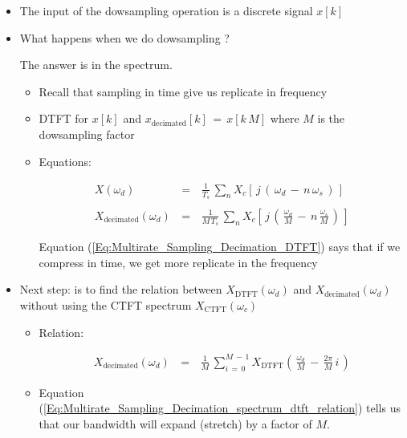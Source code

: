 \begin{itemize}

\item The input of the dowsampling operation is a discrete signal $x[k]$

\item What happens when we do dowsampling ?

The answer is in the spectrum.

\begin{itemize}
\item Recall that sampling in time give us replicate in frequency

\item DTFT for $x[k]$ and $x_{\text{decimated}}[k] \, = \, x[k \, M]$ where $M$ is the dowsampling factor


\item Equations:

\begin{equation}
\begin{array}{rcl}
X(\omega_d) \, &=& \, \displaystyle\frac{1}{T_s} \, \displaystyle\sum_n X_c \left[\, j \, \left(\, \omega_d \, - \, n \, \omega_s \,\right)  \,\right] \\ \\
X_{\text{decimated}}(\omega_d) \, &=& \, \displaystyle\frac{1}{M \, T_s} \, \displaystyle\sum_n X_c \left[\, j \, \left(\,  \displaystyle\frac{\omega_d}{M}  \, - \, n \,  \displaystyle\frac{\omega_s}{M} \,\right)  \,\right] 
\end{array}
\label{Eq:Multirate_Sampling_Decimation_spectrum_relation}
\end{equation}

Equation (\ref{Eq:Multirate_Sampling_Decimation_DTFT}) says that if we compress in time, we get more replicate in the frequency


\end{itemize}

\item Next step: is to find the relation between $X_{\text{DTFT}}(\omega_d) $ and $X_{\text{decimated}}(\omega_d) $ without using the CTFT spectrum $X_{\text{CTFT}}(\omega_c)$
	
	\begin{itemize}
	\item Relation:
	
	\begin{equation}
	\begin{array}{rcl}
		X_{\text{decimated}}(\omega_d) \, &=& \, \displaystyle	\frac{1}{M} \, \displaystyle\sum_{i \, = \, 0}^{M \, - \, 1} X_{\text{DTFT}} \left(\,  \displaystyle\frac{\omega_d}{M} \, - \, \displaystyle\frac{2 \pi}{M} \, i \,\right)   
	\end{array}	\label{Eq:Multirate_Sampling_Decimation_spectrum_dtft_relation}
	\end{equation}		
	
	\item Equation (\ref{Eq:Multirate_Sampling_Decimation_spectrum_dtft_relation}) tells us that our bandwidth will expand (stretch) by a factor of $M$.

	\end{itemize}


\end{itemize}
